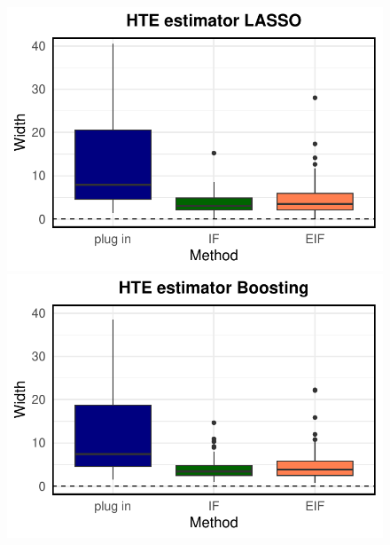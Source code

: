 \begin{figure}[ht]
\begin{minipage}{0.3\textwidth}
                \includegraphics[clip, trim = 0cm 0cm 0cm 0cm, width = \textwidth]{plot/ACIC_nonlinear_propensity_linear_HTE_CI_width_LASSO.pdf}
        \end{minipage}
        \begin{minipage}{0.3\textwidth}
                \centering
                \includegraphics[clip, trim = 0cm 0cm 0cm 0cm, width = \textwidth]{plot/ACIC_nonlinear_propensity_linear_HTE_CI_width_Boosting.pdf}
        \end{minipage}
        \begin{minipage}{0.3\textwidth}
                \centering

\end{minipage}
\end{figure}
